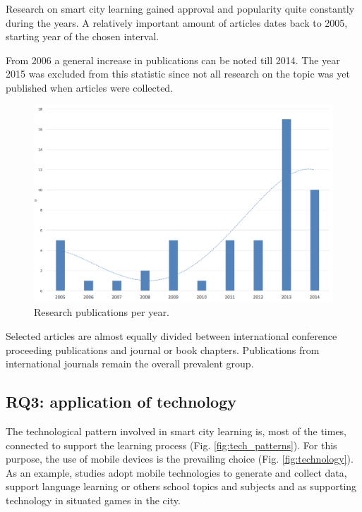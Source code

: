 Research on smart city learning gained approval and popularity quite constantly during the years. A relatively important amount of articles dates back to 2005, starting year of the chosen interval.

From 2006 a general increase in publications can be noted till 2014. The year 2015 was excluded from this statistic since not all research on the topic was yet published when articles were collected.

\begin{figure}[htb]
\centering
\includegraphics[width=12cm]{img/years}
\caption{Research publications per year.}
\label{fig:years}
\end{figure}

Selected articles are almost equally divided between international conference proceeding publications and journal or book chapters.
Publications from international journals remain the overall prevalent group.



\subsection*{RQ3: application of technology}

The technological pattern involved in smart city learning is, most of the times, connected to support the learning process (Fig. \ref{fig:tech_patterns}).
For this purpose, the use of mobile devices is the prevailing choice (Fig. \ref{fig:technology}).
As an example, studies adopt mobile technologies to generate and collect data\cite{philip_framework_2013}\cite{akkerman_storification_2009-1}, support language learning or others school topics and subjects\cite{gaved_challenges_2014} and as supporting technology in situated games in the city\cite{akkerman_storification_2009-1}\cite{huizenga_cognitive_2008}.

